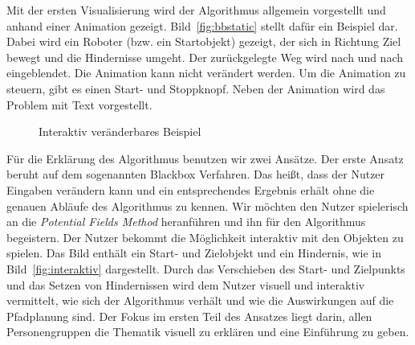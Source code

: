 Mit der ersten Visualisierung wird der Algorithmus allgemein vorgestellt und anhand einer Animation gezeigt. %
Bild~\vref{fig:bbstatic} stellt dafür ein Beispiel dar.  Dabei wird ein Roboter (bzw. ein Startobjekt) gezeigt, der sich in Richtung Ziel bewegt und die Hindernisse umgeht. Der zurückgelegte Weg wird nach und nach eingeblendet. Die Animation kann nicht verändert werden. Um die Animation zu steuern, gibt es einen Start- und Stoppknopf. Neben der Animation wird das Problem mit Text vorgestellt. %
\begin{figure}[ht!]
  \centering
  \caption{Interaktiv veränderbares Beispiel}
  \label{fig:interaktiv}
\end{figure}


Für die Erklärung des Algorithmus benutzen wir zwei Ansätze. Der erste Ansatz beruht auf dem sogenannten Blackbox Verfahren. Das heißt, dass der Nutzer  Eingaben verändern kann und  ein entsprechendes Ergebnis erhält ohne die genauen Abläufe des Algorithmus zu kennen. Wir möchten den Nutzer spielerisch an die \textit{Potential Fields Method} heranführen und ihn für den Algorithmus begeistern. Der Nutzer bekommt die Möglichkeit interaktiv mit den Objekten zu spielen. Das  Bild enthält ein Start- und Zielobjekt und ein Hindernis, wie in Bild~\vref{fig:interaktiv} dargestellt. Durch das Verschieben des Start- und Zielpunkts und das Setzen von Hindernissen wird dem Nutzer visuell und interaktiv vermittelt, wie sich der Algorithmus verhält und wie die Auswirkungen auf die Pfadplanung sind. Der Fokus im ersten Teil des Ansatzes liegt darin, allen Personengruppen die Thematik visuell zu erklären und eine Einführung zu geben.


